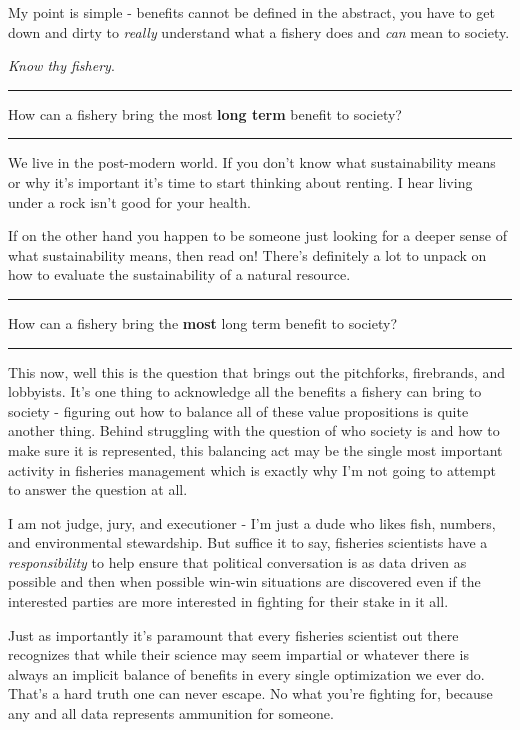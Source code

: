 \documentclass[11pt,a5paper]{book}
\begin{document}
My point is simple - benefits cannot be defined in the abstract, you have to get down and dirty to \textit{really} understand what a fishery does and \textit{can} mean to society. 
\newline

\textit{Know thy fishery}.
\newpage


\noindent \rule{\textwidth}{0.5pt} 
\noindent How can a fishery bring the most \textbf{long term} benefit to society?
\newline
\rule{\textwidth}{0.5pt} 
\vspace{5pt}

We live in the post-modern world. If you don't know what sustainability means or why it's important it's time to start thinking about renting. I hear living under a rock isn't good for your health.
\newline

If on the other hand you happen to be someone just looking for a deeper sense of what sustainability means, then read on! There's definitely a lot to unpack on how to evaluate the sustainability of a natural resource.
\newpage


\noindent \rule{\textwidth}{0.5pt} 
\noindent How can a fishery bring the \textbf{most} long term benefit to society?
\newline
\rule{\textwidth}{0.5pt} 
\vspace{5pt}

This now, well this is the question that brings out the pitchforks, firebrands, and lobbyists. It's one thing to acknowledge all the benefits a fishery can bring to society - figuring out how to balance all of these value propositions is quite another thing. Behind struggling with the question of who society is and how to make sure it is represented, this balancing act may be the single most important activity in fisheries management which is exactly why I'm not going to attempt to answer the question at all. 
\newline

I am not judge, jury, and executioner - I'm just a dude who likes fish, numbers, and environmental stewardship. But suffice it to say, fisheries scientists have a \textit{responsibility} to help ensure that political conversation is as data driven as possible and then when possible win-win situations are discovered even if the interested parties are more interested in fighting for their stake in it all.
\newline

Just as importantly it's paramount that every fisheries scientist out there recognizes that while their science may seem impartial or whatever there is always an implicit balance of benefits in every single optimization we ever do. That's a hard truth one can never escape. No what you're fighting for, because any and all data represents ammunition for someone. 
\newpage
\end{document}
